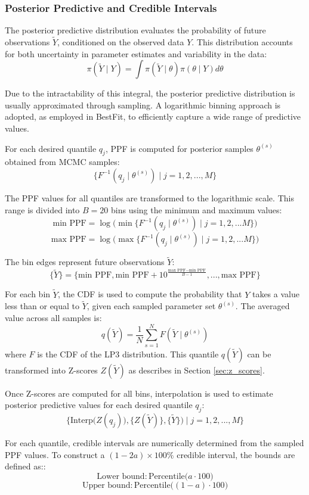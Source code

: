 \subsubsection{Posterior Predictive and Credible Intervals}
The posterior predictive distribution evaluates the probability of future observations $\tilde{Y}$, conditioned on the observed data $Y$. This distribution accounts for both uncertainty in parameter estimates and variability in the data: 
$$\pi (\tilde{Y} \mid Y)= \int \pi(\tilde{Y} \mid \theta)\pi(\theta\mid Y) d\theta$$

Due to the intractability of this integral, the posterior predictive distribution is usually approximated through sampling. A logarithmic binning approach is adopted, as employed in BestFit, to efficiently capture a wide range of predictive values.

For each desired quantile $q_j$, PPF is computed for posterior samples $\theta^{(s)}$ obtained from MCMC samples: 
$$\big\{F^{-1} (q_j \mid \theta^{(s)}) \mid j = 1, 2, ..., M\big\}$$

The PPF values for all quantiles are transformed to the logarithmic scale. This range is divided into $B = 20$ bins using the minimum and maximum values:
$$\text{min PPF} = \log \big(\min \big\{F^{-1} (q_j \mid \theta^{(s)} ) \mid j = 1, 2, ...M \big\}\big)$$
$$\text{max PPF} = \log \big(\max \big\{F^{-1} (q_j \mid \theta^{(s)}) \mid j = 1, 2, ...M \big\}\big)$$

The bin edges represent future observations $\tilde{Y}$:
$$ \{\tilde{Y}\} = \big\{ \text{min PPF}, \text{min PPF}+ 10^{\frac{\text{max PPF} - \text{min PPF}}{B-1}}, ..., \text{max PPF} \big\}$$

For each bin $\tilde{Y}$, the CDF is used to compute the probability that $Y$ takes a value less than or equal to $\tilde{Y}$, given each sampled parameter set $\theta^{(s)}$. The averaged value across all samples is:
$$q({\tilde{Y}}) = \frac{1}{N} \sum_{s=1}^N F(\tilde{Y} \mid \theta^{(s)})$$
where $F$ is the CDF of the LP3 distribution. This quantile $q({\tilde{Y}})$ can be transformed into Z-scores $Z({\tilde{Y}})$ as describes in Section \ref{sec:z_scores}. 

Once Z-scores are computed for all bins, interpolation is used to estimate posterior predictive values for each desired quantile $q_j$:
$$\big \{\text{Interp} \big(Z(q_j)), \{Z({\tilde{Y}})\}, \{\tilde{Y}\}\big) \mid j = 1, 2, ..., M \big\}$$

For each quantile, credible intervals are numerically determined from the sampled PPF values. To construct a $(1 - 2a) \times 100\%$ credible interval, the bounds are defined as::
$$\text{Lower bound}: \text{Percentile} \big(a \cdot 100 \big)$$
$$\text{Upper bound}: \text{Percentile} \big((1-a) \cdot 100 \big)$$

